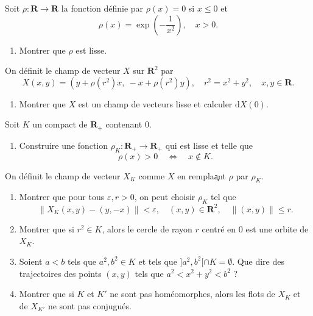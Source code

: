 \documentclass[a4paper,10pt,openany]{article}
\theoremstyle{plain}
\theoremstyle{definition}
\newcommand{\dd}{\mathrm{d}}
\newcommand{\R}{\mathbf{R}}
\begin{document}
 \vspace{1.5mm} 

\noindent Soit $\rho : \R \to \R$ la fonction d\'efinie par $\rho(x) = 0$ si $x \leq 0$ et 
$$
\rho(x) = \exp\left(-\frac{1}{x^2}\right), \quad x > 0.
$$

\begin{enumerate}
\item Montrer que $\rho$ est lisse.
\end{enumerate}
On d\'efinit le champ de vecteur $X$ sur $\R^2$ par 
$$
X(x,y) = \left(y + \rho(r^2)x,~-x + \rho(r^2)y\right), \quad r^2 = x^2 + y^2, \quad x,y \in \R.
$$
\begin{enumerate}[resume]
\item Montrer que $X$ est un champ de vecteurs lisse et calculer $\dd X(0).$
\end{enumerate}
Soit $K$ un compact de $\R_+$ contenant $0$.
\begin{enumerate}[resume]
\item Construire une fonction $\rho_K : \R_+ \to \R_+$ qui est lisse et telle que 
$$\rho(x) > 0 \quad \iff \quad x \notin K.$$
\end{enumerate}
On d\'efinit le champ de vecteur $X_K$ comme $X$ en rempla\c ant $\rho$ par $\rho_K$.
\begin{enumerate}[resume]
\item Montrer que pour tous $\varepsilon, r > 0$, on peut choisir $\rho_K$ tel que
$$
\|X_K(x,y) - (y,-x)\|< \varepsilon, \quad (x,y) \in \R^2, \quad \|(x,y)\|\leq r.
$$
\item Montrer que si $r^2 \in K$, alors le cercle de rayon $r$ centr\'e en $0$ est une orbite de $X_K$.
\item Soient $a<b$ tels que $a^2, b^2 \in K$ et tels que $]a^2, b^2[ \cap K = \emptyset.$ Que dire des trajectoires des points $(x,y)$ tels que $a^2 < x^2 + y^2 < b^2$ ?
\item Montrer que si $K$ et $K'$ ne sont pas hom\'eomorphes, alors les flots de $X_K$ et de $X_{K'}$ ne sont pas conjugu\'es.
\end{enumerate}
\end{document}
